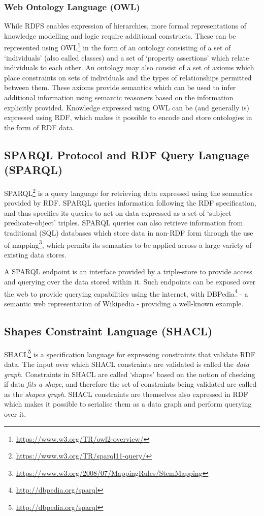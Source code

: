 \subsubsection{Web Ontology Language (OWL)}
While RDFS enables expression of hierarchies, more formal representations of knowledge modelling and logic require additional constructs. These can be represented using OWL\footnote{\url{https://www.w3.org/TR/owl2-overview/}} in the form of an ontology consisting of a set of `individuals' (also called classes) and a set of `property assertions' which relate individuals to each other.
An ontology may also consist of a set of axioms which place constraints on sets of individuals and the types of relationships permitted between them. These axioms provide semantics which can be used to infer additional information using semantic reasoners based on the information explicitly provided.
Knowledge expressed using OWL can be (and generally is) expressed using RDF, which makes it possible to encode and store ontologies in the form of RDF data.

\subsection{SPARQL Protocol and RDF Query Language (SPARQL)}
SPARQL\footnote{\url{https://www.w3.org/TR/sparql11-query/}} is a query language for retrieving data expressed using the semantics provided by RDF.
SPARQL queries information following the RDF specification, and thus specifies its queries to act on data expressed as a set of `subject-predicate-object' triples.
SPARQL queries can also retrieve information from traditional (SQL) databases which store data in non-RDF form through the use of mapping\footnote{\url{https://www.w3.org/2008/07/MappingRules/StemMapping}}, which permits its semantics to be applied across a large variety of existing data stores.

A SPARQL endpoint is an interface provided by a triple-store to provide access and querying over the data stored within it. Such endpoints can be exposed over the web to provide querying capabilities using the internet, with DBPedia\footnote{\url{http://dbpedia.org/sparql}} - a semantic web representation of Wikipedia - providing a well-known example.

\subsection{Shapes Constraint Language (SHACL)}
SHACL\footnote{\url{http://dbpedia.org/sparql}} is a specification language for expressing constraints that validate RDF data. The input over which SHACL constraints are validated is called the \textit{data graph}.
Constraints in SHACL are called `shapes' based on the notion of checking if data \textit{fits a shape}, and therefore the set of constraints being validated are called as the \textit{shapes graph}.
SHACL constraints are themselves also expressed in RDF which makes it possible to serialise them as a data graph and perform querying over it.

